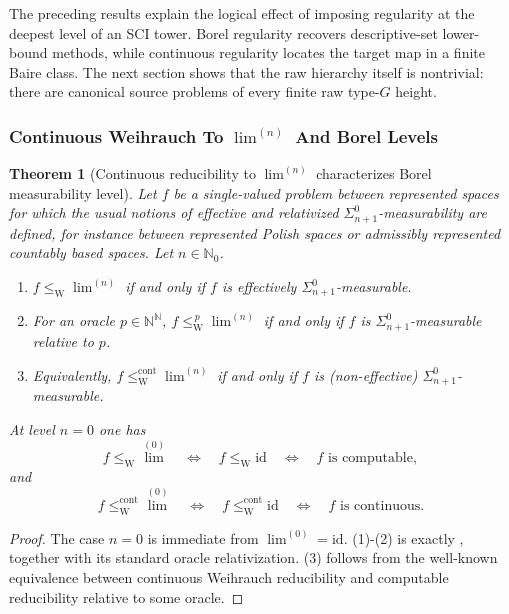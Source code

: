 \documentclass{lmcs} %
\theoremstyle{plain}
\theoremstyle{plain}
\newtheorem{theorem}{Theorem}[section]
\theoremstyle{definition}
\theoremstyle{remark}
\theoremstyle{definition}
\theoremstyle{remark}
\numberwithin{equation}{section}
\newcommand{\Lim}{\operatorname{lim}}
\newcommand{\Limi}[1]{\Lim^{(#1)}}
\begin{document}
The preceding results explain the logical effect of imposing regularity at the deepest
level of an SCI tower. Borel regularity recovers descriptive-set lower-bound methods,
while continuous regularity locates the target map in a finite Baire class. The next
section shows that the raw hierarchy itself is nontrivial: there are canonical source
problems of every finite raw type-\(G\) height.

\subsubsection{Continuous Weihrauch To \texorpdfstring{$\Limi{n}$}{limn} And Borel Levels}

\begin{theorem}[Continuous reducibility to $\Limi{n}$ characterizes Borel measurability level]\label{thm:bgp-relativized}
Let \(f\) be a single-valued problem between represented spaces for which the usual
notions of effective and relativized \(\Sigma^0_{n+1}\)-measurability are defined, for
instance between represented Polish spaces or admissibly represented countably based
spaces. Let \(n\in\mathbb N_0\).
\begin{enumerate}
\item $f\le_{\mathrm W}\Limi{n}$ if and only if $f$ is \textit{effectively} $\Sigma^0_{n+1}$-measurable.
\item For an oracle $p\in\mathbb{N}^{\mathbb{N}}$, $f\le_{\mathrm W}^{\,p}\Limi{n}$ if and only if
$f$ is $\Sigma^0_{n+1}$-measurable \textit{relative to $p$}.
\item Equivalently, $f\le_{\mathrm W}^{\mathrm{cont}}\Limi{n}$ if and only if $f$ is (non-effective)
$\Sigma^0_{n+1}$-measurable.
\end{enumerate}

At level $n=0$ one has
\[
f \le_{\mathrm W} \Limi{0}
\quad\Longleftrightarrow\quad
f \le_{\mathrm W} \mathrm{id}
\quad\Longleftrightarrow\quad
f \text{ is computable},
\]
and
\[
f \le_{\mathrm W}^{\mathrm{cont}} \Limi{0}
\quad\Longleftrightarrow\quad
f \le_{\mathrm W}^{\mathrm{cont}} \mathrm{id}
\quad\Longleftrightarrow\quad
f \text{ is continuous}.
\]
\end{theorem}
\begin{proof}
The case $n\!=\!0$ is immediate from $\Limi{0}=\mathrm{id}$. (1)-(2) is exactly \cite[Theorem~6.5]{brattka2021weihrauch}, together with its standard oracle relativization.
(3) follows from the well-known equivalence between continuous Weihrauch reducibility and
computable reducibility relative to some oracle.
\end{proof}
\end{document}

